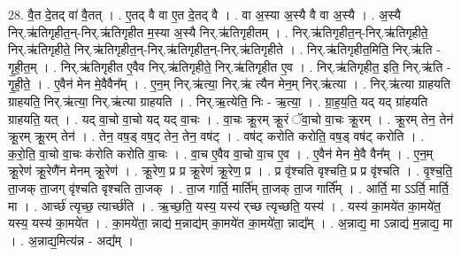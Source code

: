 \documentclass[17pt]{extarticle}
\begin{document}
28. वै॒त दे॒तद् वा॑ वै॒तत् । . ए॒तद् वै वा ए॒त दे॒तद् वै । . वा अ॒स्या अ॒स्यै वै वा अ॒स्यै । . अ॒स्यै निर्.ऋ॑तिगृहीत॒न्-निर्.ऋ॑तिगृहीत म॒स्या अ॒स्यै निर्.ऋ॑तिगृहीतम् । . निर्.ऋ॑तिगृहीत॒न्-निर्.ऋ॑तिगृहीते॒ निर्.ऋ॑तिगृहीते॒ निर्.ऋ॑तिगृहीत॒न्-निर्.ऋ॑तिगृहीत॒न्-निर्.ऋ॑तिगृहीते । . निर्.ऋ॑तिगृहीत॒मिति॒ निर्.ऋ॑ति - गृ॒ही॒त॒म् । . निर्.ऋ॑तिगृहीत ए॒वैव निर्.ऋ॑तिगृहीते॒ निर्.ऋ॑तिगृहीत ए॒व । . निर्.ऋ॑तिगृहीत॒ इति॒ निर्.ऋ॑ति - गृ॒ही॒ते॒ । . ए॒वैन॑ मेन मे॒वैवैन᳚म् । . ए॒न॒म् निर्.ऋ॑त्या॒ निर्.ऋ॑ त्यैन मेन॒म् निर्.ऋ॑त्या । . निर्.ऋ॑त्या ग्राहयति ग्राहयति॒ निर्.ऋ॑त्या॒ निर्.ऋ॑त्या ग्राहयति । . निर्.ऋ॒त्येति॒ निः - ऋ॒त्या॒ । . ग्रा॒ह॒य॒ति॒ यद् यद् ग्रा॑हयति ग्राहयति॒ यत् । . यद् वा॒चो वा॒चो यद् यद् वा॒चः । . वा॒चः क्रू॒रम् क्रू॒रं ॅवा॒चो वा॒चः क्रू॒रम् । . क्रू॒रम् तेन॒ तेन॑ क्रू॒रम् क्रू॒रम् तेन॑ । . तेन॒ वष॒ड् वष॒ट् तेन॒ तेन॒ वष॑ट् । . वष॑ट् करोति करोति॒ वष॒ड् वष॑ट् करोति । . क॒रो॒ति॒ वा॒चो वा॒चः क॑रोति करोति वा॒चः । . वा॒च ए॒वैव वा॒चो वा॒च ए॒व । . ए॒वैन॑ मेन मे॒वै वैन᳚म् । . ए॒न॒म् क्रू॒रेण॑ क्रू॒रेणै॑न मेनम् क्रू॒रेण॑ । . क्रू॒रेण॒ प्र प्र क्रू॒रेण॑ क्रू॒रेण॒ प्र । . प्र वृ॑श्चति वृश्चति॒ प्र प्र वृ॑श्चति । . वृ॒श्च॒ति॒ ता॒जक् ता॒जग् वृ॑श्चति वृश्चति ता॒जक् । . ता॒ज गार्ति॒ मार्ति॑म् ता॒जक् ता॒ज गार्ति᳚म् । . आर्ति॒ मा ऽऽर्ति॒ मार्ति॒ मा । . आर्च्छ॑ त्यृच्छ॒ त्यार्च्छ॑ति । . ऋ॒च्छ॒ति॒ यस्य॒ यस्य॑ र्‌च्छ त्यृच्छति॒ यस्य॑ । . यस्य॑ का॒मये॑त का॒मये॑त॒ यस्य॒ यस्य॑ का॒मये॑त । . का॒मये॑ता॒ न्नाद्य॑ म॒न्नाद्य॑म् का॒मये॑त का॒मये॑ता॒ न्नाद्य᳚म् । . अ॒न्नाद्य॒ मा ऽन्नाद्य॑ म॒न्नाद्य॒ मा । . अ॒न्नाद्य॒मित्य॑न्न - अद्य᳚म् । \newline
\end{document}
